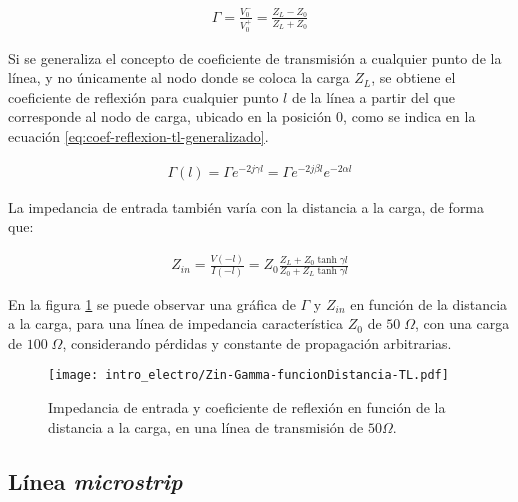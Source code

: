 \begin{align}
	\label{eq:coef-reflexion-tl}
	\Gamma = \frac{V_0^-}{V_0^+} = \frac{Z_L-Z_0}{Z_L+Z_0}
\end{align}

Si se generaliza el concepto de coeficiente de transmisión a cualquier punto de la línea, y no únicamente al nodo donde se coloca la carga $Z_L$, se obtiene el coeficiente de reflexión para cualquier punto $l$ de la línea a partir del que corresponde al nodo de carga, ubicado en la posición 0, como se indica en la ecuación \ref{eq:coef-reflexion-tl-generalizado}.

\begin{align}
\label{eq:coef-reflexion-tl-generalizado}
\Gamma(l) = \Gamma e^{-2j\gamma l} = \Gamma e^{-2j\beta l} e^{-2\alpha l}
\end{align}

La impedancia de entrada también varía con la distancia a la carga, de forma que:

\begin{align}
Z_{in} = \frac{V(-l)}{I(-l)} = Z_0 \frac{Z_L +Z_0 \tanh \gamma l}{Z_0 + Z_L \tanh \gamma l}
\end{align}

En la figura \ref{fig:Zin-Gamma-funcionDistancia-TL} se puede observar una gráfica de $\Gamma$ y $Z_{in}$ en función de la distancia a la carga, para una línea de impedancia característica $Z_0$ de $50 \; \Omega$, con una carga de $100 \; \Omega$, considerando pérdidas y constante de propagación arbitrarias.



\begin{figure}[htp]
	\centering
	\texttt{[image: intro\_electro/Zin-Gamma-funcionDistancia-TL.pdf]}
	\caption{Impedancia de entrada y coeficiente de reflexión en función de la distancia a la carga, en una línea de transmisión de $50 \Omega$.}
	\label{fig:Zin-Gamma-funcionDistancia-TL}
\end{figure}
\subsection{Línea \textit{microstrip}}


